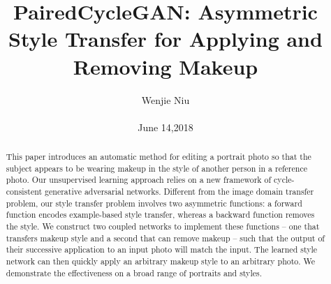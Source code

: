 \documentclass[10pt,twocolumn,letterpaper]{article}
\begin{document}
\title{PairedCycleGAN: Asymmetric Style Transfer
for Applying and Removing Makeup}

\author{Wenjie Niu\\\\ June 14,2018}

\maketitle

\begin{abstract}
This paper introduces an automatic method for editing
a portrait photo so that the subject appears to be wearing
makeup in the style of another person in a reference
photo. Our unsupervised learning approach relies on a
new framework of cycle-consistent generative adversarial
networks. Different from the image domain transfer problem,
our style transfer problem involves two asymmetric
functions: a forward function encodes example-based style
transfer, whereas a backward function removes the style. We
construct two coupled networks to implement these functions
– one that transfers makeup style and a second that
can remove makeup – such that the output of their successive
application to an input photo will match the input. The
learned style network can then quickly apply an arbitrary
makeup style to an arbitrary photo. We demonstrate the effectiveness
on a broad range of portraits and styles.\cite{Chang_2018_CVPR}\par
\end{abstract}

\end{document}
